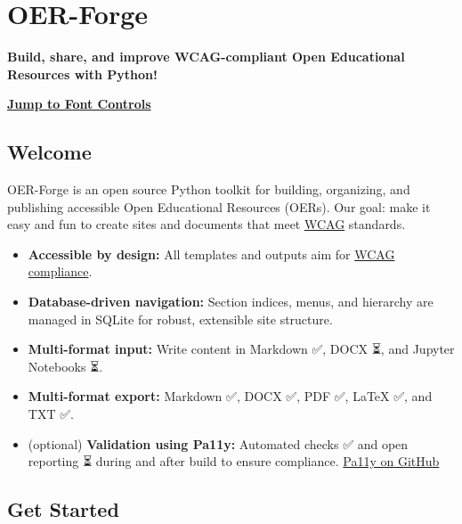 \section{OER-Forge}\label{oer-forge}

\textbf{Build, share, and improve WCAG-compliant Open Educational
Resources with Python!}

\hyperref[font-controls]{\textbf{Jump to Font Controls}}

\subsection{Welcome}\label{welcome}

OER-Forge is an open source Python toolkit for building, organizing, and
publishing accessible Open Educational Resources (OERs). Our goal: make
it easy and fun to create sites and documents that meet
\href{https://www.w3.org/WAI/standards-guidelines/wcag/}{WCAG}
standards.

\begin{itemize}
\tightlist
\item
  \textbf{Accessible by design:} All templates and outputs aim for
  \href{https://www.w3.org/WAI/standards-guidelines/wcag/}{WCAG
  compliance}.
\item
  \textbf{Database-driven navigation:} Section indices, menus, and
  hierarchy are managed in SQLite for robust, extensible site structure.
\item
  \textbf{Multi-format input:} Write content in Markdown ✅, DOCX ⏳,
  and Jupyter Notebooks ⏳.
\item
  \textbf{Multi-format export:} Markdown ✅, DOCX ✅, PDF ✅, LaTeX ✅,
  and TXT ✅.
\item
  (optional) \textbf{Validation using Pa11y:} Automated checks ✅ and
  open reporting ⏳ during and after build to ensure compliance.
  \href{https://github.com/pa11y/pa11y}{Pa11y on GitHub}
\end{itemize}

\subsection{Get Started}\label{get-started}

